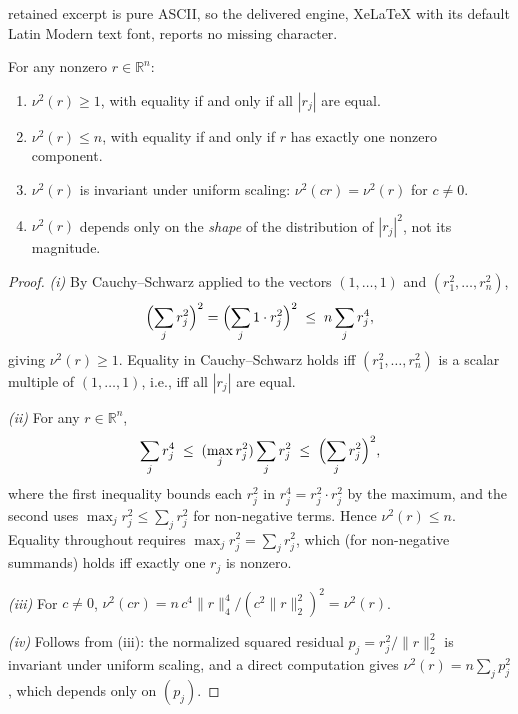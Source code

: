 \documentclass[10pt,a4paper]{amsart}
\newcommand{\R}{\mathbb{R}}
\begin{document}
retained excerpt is pure ASCII, so the delivered engine, XeLaTeX with its default Latin Modern text font, reports no missing character.
\begin{lemma}
\label{lem:ipr-properties}
For any nonzero $r \in \R^n$:
\begin{enumerate}[label=(\roman*)]
    \item $\nu^2(r) \geq 1$, with equality if and only if all $|r_j|$ are equal.
    \item $\nu^2(r) \leq n$, with equality if and only if $r$ has exactly one nonzero component.
    \item $\nu^2(r)$ is invariant under uniform scaling: $\nu^2(cr) = \nu^2(r)$ for $c \neq 0$.
    \item $\nu^2(r)$ depends only on the \emph{shape} of the distribution of $|r_j|^2$, not its magnitude.
\end{enumerate}
\end{lemma}

\begin{proof}
\textit{(i)} By Cauchy--Schwarz applied to the vectors
$(1, \ldots, 1)$ and $(r_1^2, \ldots, r_n^2)$,
\[
\Bigl(\sum_j r_j^2\Bigr)^2 = \Bigl(\sum_j 1 \cdot r_j^2\Bigr)^2
\;\leq\; n \sum_j r_j^4,
\]
giving $\nu^2(r) \geq 1$. Equality in Cauchy--Schwarz holds iff
$(r_1^2, \ldots, r_n^2)$ is a scalar multiple of $(1, \ldots, 1)$,
i.e., iff all $|r_j|$ are equal.

\textit{(ii)} For any $r \in \R^n$,
\[
\sum_j r_j^4
\;\leq\; (\max_j r_j^2) \sum_j r_j^2
\;\leq\; \Bigl(\sum_j r_j^2\Bigr)^2,
\]
where the first inequality bounds each $r_j^2$ in $r_j^4 = r_j^2 \cdot r_j^2$
by the maximum, and the second uses $\max_j r_j^2 \leq \sum_j r_j^2$ for
non-negative terms. Hence $\nu^2(r) \leq n$. Equality throughout requires
$\max_j r_j^2 = \sum_j r_j^2$, which (for non-negative summands) holds iff
exactly one $r_j$ is nonzero.

\textit{(iii)} For $c \neq 0$,
$\nu^2(cr) = n\,c^4 \|r\|_4^4 / (c^2 \|r\|_2^2)^2 = \nu^2(r)$.

\textit{(iv)} Follows from (iii): the normalized squared residual
$p_j = r_j^2/\|r\|_2^2$ is invariant under uniform scaling, and a direct
computation gives $\nu^2(r) = n\sum_j p_j^2$, which depends only on $(p_j)$.
\end{proof}
\end{document}

